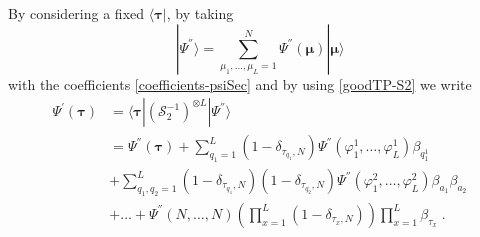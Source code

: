 \documentclass[10pt]{article}
\numberwithin{equation}{section}
\numberwithin{equation}{subsection}
\newcommand{\dt}{\;.}
\begin{document}
\begin{comment}
The product $\left(\mathcal{S}_{2}^{-1}\right)^{\otimes L}|\Psi^{''}\rangle$ gives a vector $|\Psi^{'}\rangle$ whose component are denoted by $\Psi^{'}(\bm{\tau})$. 
To find these quantities we need to fix the rows correspondent to $\bm{\tau}$ in the matrix $\left(\mathcal{S}_{2}^{-1}\right)^{\otimes L}$. Consider a string $\bm{\tau}=(\tau_{1},\ldots,\tau_{L})$ with $\tau_{1},\ldots,\tau_{L}\in \{1,\ldots,N\}$, then the corresponding row reads
\begin{equation}
	\begin{split}
\left(\mathcal{S}_{2}^{-1}\right)^{\otimes L}_{\bm{\tau}}&=\,e_{\tau_{1},\ldots,\tau_{L}}^{\tau_{1},\ldots,\tau_{L}}+\sum_{q_{1}=1}^{L}(1-\delta_{\tau_{q_{1}},N})e_{\tau_{1},\ldots,\tau_{L}}^{\varphi_{1}^{1},\ldots,\varphi_{L}^{1}}\beta_{\tau_{q_{1}}}\\&+\sum_{q_{1},q_{2}=1\,:\,q_{1}\neq q_{2}}^{L}(1-\delta_{\tau_{q_{1}},N})(1-\delta_{\tau_{q_{2}},N})e_{\tau_{1},\ldots,\tau_{L}}^{\varphi_{1}^{2},\ldots,\varphi_{L}^{2}}\beta_{\tau_{q_{1}}}\beta_{\tau_{q_{2}}}
  \\&+
  \ldots+\sum_{q_{1},\ldots,q_{L}=1\,:\,q_{i}\neq q_{j}\;\text{if}\;i\neq j}^{L}\left(\prod_{x=1}^{L}(1-\delta_{\tau_{x},N})\right)\left(\beta_{\tau_{x}}\right)^{1-\delta_{\tau_{x},1}}e_{\tau_{1},\ldots,\tau_{L}}^{\varphi_{1}^{L},\ldots,\varphi_{L}^{L}}
	\end{split}
\end{equation}
\end{comment}
By considering a fixed $\langle\bm{\tau}|$, by taking \begin{equation}|\Psi^{''}\rangle=\sum_{\mu_{1},\ldots,\mu_{L}=1}^{N}\Psi^{''}(\bm{\mu})|\bm{\mu}\rangle\end{equation} with the coefficients \eqref{coefficients-psiSec} and by using \eqref{goodTP-S2} we write 
\begin{equation}\label{ABS_intermediate}
	\begin{split}
		\Psi^{'}(\bm{\tau})&=\langle \bm{\tau}|(\mathcal{S}_{2}^{-1})^{\otimes L}|\Psi^{''}\rangle\\&= \Psi^{''}(\bm{\tau})+\sum_{q_{1}= 1}^{L}(1-\delta_{\tau_{q_{1}},N})\Psi^{''}(\varphi_{1}^{1},\ldots,\varphi_{L}^{1})\beta_{q_{1}^{1}}\\&+
		\sum_{q_{1},q_{2}= 1}^{L}(1-\delta_{\tau_{q_{1}},N})(1-\delta_{\tau_{q_{2}},N})\Psi^{''}(\varphi_{1}^{2},\ldots,\varphi_{L}^{2})\beta_{a_{1}}\beta_{a_{2}}\\&+\ldots+\Psi^{''}(N,\ldots,N)\left(\prod_{x=1}^{L}(1-\delta_{\tau_{x},N})\right)\prod_{x=1}^{L}\beta_{\tau_{x}}\dt%
	\end{split}
\end{equation}
\end{document}
